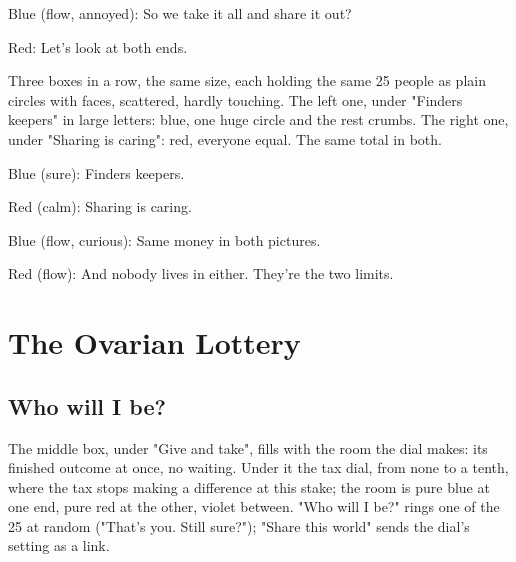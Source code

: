 Blue (flow, annoyed): So we take it all and share it out?

Red: Let's look at both ends.

\label{limits}

Three boxes in a row, the same size, each holding the same 25 people as plain
circles with faces, scattered, hardly touching. The left one, under "Finders
keepers" in large letters: blue, one huge circle and the rest crumbs. The right
one, under "Sharing is caring": red, everyone equal. The same total in both.


Blue (sure): Finders keepers.

Red (calm): Sharing is caring.

Blue (flow, curious): Same money in both pictures.

Red (flow): And nobody lives in either. They're the two limits.

\section{The Ovarian Lottery}\label{index:ovarian-lottery}

\subsection{Who will I be?}\label{act:lottery}

\label{veil}

The middle box, under "Give and take", fills with the room the dial makes:
its finished outcome at once, no waiting. Under it the tax dial, from none to
a tenth, where the tax stops making a difference at this stake; the room is
pure blue at one end, pure red at the other, violet between. "Who will I be?"
rings one of the 25 at random ("That's you. Still sure?"); "Share this world"
sends the dial's setting as a link.


